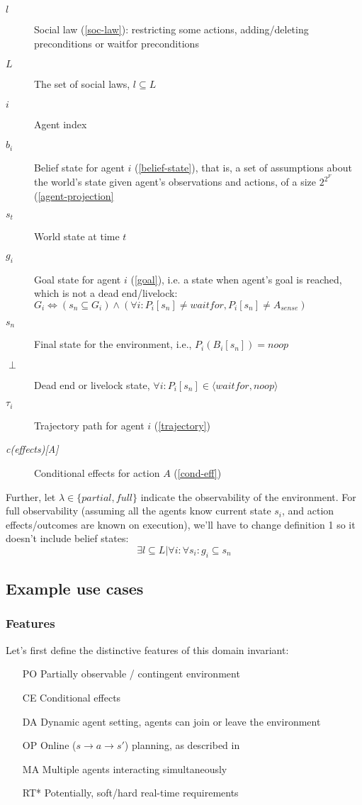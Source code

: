 \documentclass[fleqn,10pt]{olplainarticle}
\begin{document}
\begin{description}
    \item[$l$] Social law (\ref{soc-law}): restricting some actions, adding/deleting preconditions or waitfor preconditions
    \item[$L$] The set of social laws, $l \subseteq L$
    \item[$i$] Agent index
    \item[$b_i$] Belief state for agent $i$ (\ref{belief-state}), that is, a set of assumptions about the world's state given agent's observations and actions, of a size $2^{2^F}$ (\ref{agent-projection}
    \item[$s_t$] World state at time $t$
    \item[$g_i$] Goal state for agent $i$ (\ref{goal}), i.e. a state when agent's goal is reached, which is not a dead end/livelock: $G_i \iff (s_n \subseteq G_i) \land (\forall i: P_i[s_n] \neq waitfor, P_i[s_n] \neq A_{sense})$
    \item[$s_n$] Final state for the environment, i.e., $P_i(B_i[s_n]) = noop$
    \item[$\perp$] Dead end or livelock state, $\forall i: P_i[s_n] \in \langle waitfor, noop \rangle$
    \item[$\tau_i$] Trajectory path for agent $i$ (\ref{trajectory})
    \item[\textit{c(effects)[A]}] Conditional effects for action $A$ (\ref{cond-eff})
    \
\end{description}

Further, let $\lambda \in \{partial, full\}$ indicate the observability of the environment.
For full observability (assuming all the agents know current state $s_i$, and action effects/outcomes are known on execution), we'll have to change definition 1 so it doesn't include belief states:
\begin{equation}
    \exists l \subseteq L \vert \forall i:
    \forall s_i : g_i \subseteq s_n
\end{equation}

\subsection{Example use cases}
\subsubsection{Features}
Let's first define the distinctive features of this domain invariant:
\begin{itemize}
    \item [PO] Partially observable / contingent environment
    \item [CE] Conditional effects
    \item [DA] Dynamic agent setting, agents can join or leave the environment
    \item [OP] Online ($s \rightarrow a \rightarrow s'$) planning, as described in \cite{maliah_computing_2022}
    \item [MA] Multiple agents interacting simultaneously
    \item [RT*] Potentially, soft/hard real-time requirements
\end{itemize}
\end{document}
